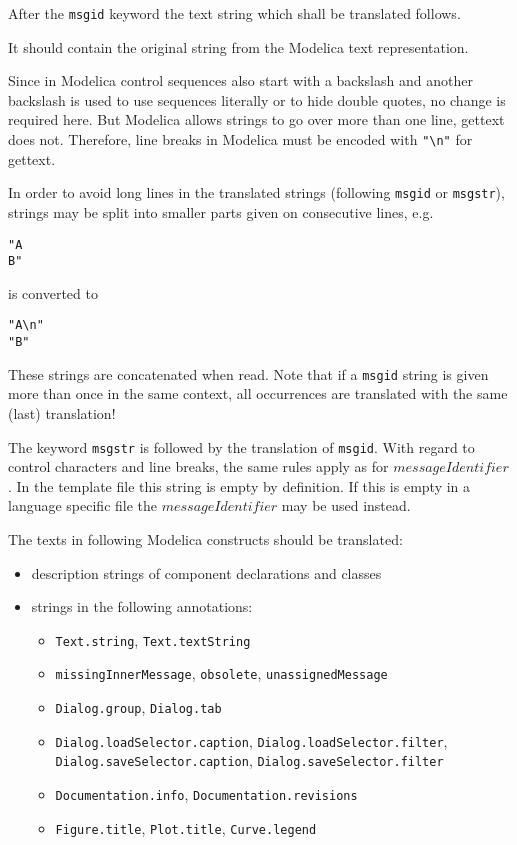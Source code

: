 \begin{nonnormative}
After the \lstinline!msgid! keyword the text string which shall be translated follows.
\end{nonnormative}
It should contain the original string from the Modelica text representation.
\begin{nonnormative}
Since in Modelica control sequences also start with a backslash and another backslash is used to use sequences literally or to hide double quotes, no change is required here.
But Modelica allows strings to go over more than one line, gettext does not.
Therefore, line breaks in Modelica must be encoded with \lstinline!"\n"! for gettext.

In order to avoid long lines in the translated strings (following \lstinline!msgid! or \lstinline!msgstr!), strings may be split into smaller parts given on consecutive lines, e.g.
\begin{lstlisting}
"A
B"
\end{lstlisting}
is converted to
\begin{lstlisting}
"A\n"
"B"
\end{lstlisting}
These strings are concatenated when read.
Note that if a \lstinline!msgid! string is given more than once in the same context, all occurrences are translated with the same (last) translation!

The keyword \lstinline!msgstr! is followed by the translation of \lstinline!msgid!.
With regard to control characters and line breaks, the same rules apply as for $\mathit{messageIdentifier}$.
In the template file this string is empty by definition.
If this is empty in a language specific file the $\mathit{messageIdentifier}$ may be used instead.
\end{nonnormative}

The texts in following Modelica constructs should be translated:
\begin{itemize}
\item description strings of component declarations and classes
\item strings in the following annotations:
\begin{itemize}
\item \lstinline!Text.string!, \lstinline!Text.textString!
\item \lstinline!missingInnerMessage!, \lstinline!obsolete!, \lstinline!unassignedMessage!
\item \lstinline!Dialog.group!, \lstinline!Dialog.tab!
\item \lstinline!Dialog.loadSelector.caption!, \lstinline!Dialog.loadSelector.filter!, \lstinline!Dialog.saveSelector.caption!, \lstinline!Dialog.saveSelector.filter!
\item \lstinline!Documentation.info!, \lstinline!Documentation.revisions!
\item \lstinline!Figure.title!, \lstinline!Plot.title!, \lstinline!Curve.legend!
\end{itemize}
\end{itemize}

